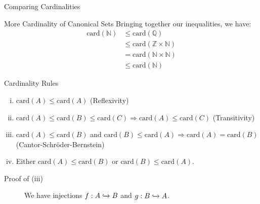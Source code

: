 \documentclass[10pt]{extarticle}
\begin{document}
\begin{problem}{Comparing Cardinalities}
\begin{problem}{More Cardinality of Canonical Sets}
      Bringing together our inequalities, we have:
      \begin{align*}
        \text{card}(\mathbb{N}) &\leq \text{card}(\mathbb{Q})\\
                                &\leq \text{card}(\mathbb{Z}\times \mathbb{N})\\
                                &=\text{card}(\mathbb{N}\times \mathbb{N})\\
                                &\leq \text{card}(\mathbb{N})
      \end{align*}
    \end{problem}
    \begin{problem}{Cardinality Rules}
      \begin{enumerate}[(i)]
        \item $\text{card}(A) \leq \text{card}(A)$ (Reflexivity)
        \item $\text{card}(A)\leq \text{card}(B) \leq \text{card}(C)\Rightarrow \text{card}(A) \leq \text{card}(C)$ (Transitivity)
        \item $\text{card}(A) \leq \text{card}(B)$ and $\text{card}(B) \leq \text{card}(A) \Rightarrow \text{card}(A) = \text{card}(B)$ (Cantor-Schröder-Bernstein)
        \item Either $\text{card}(A) \leq \text{card}(B)$ or $\text{card}(B) \leq \text{card}(A)$.
      \end{enumerate}
      \tcblower
      \begin{description}
        \item[Proof of (iii)] We have injections $f: A\xhookrightarrow{}B$ and $g:B\xhookrightarrow{} A$.\\


\end{description}
\end{problem}
\end{problem}
\end{document}
